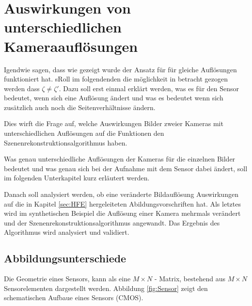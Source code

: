 \chapter{Auswirkungen von unterschiedlichen Kameraauflösungen}
\label{sec:minimalAuf} 



Igendwie sagen, dass wie gezeigt wurde der Ansatz für für gleiche Auflösungen funktioniert hat. sRoll im folgendenden die möglichkeit in betracht gezogen werden dass $\zeta \neq \zeta'$. Dazu soll erst einmal erklärt werden, was es für den Sensor bedeutet, wenn sich eine Auflösung ändert und was es bedeutet wenn sich zusätzlich auch noch die Seitenverhältnisse ändern.




Dies wirft die Frage auf, welche Auswirkungen Bilder zweier Kameras mit unterschiedlichen Auflösungen auf die Funktionen den Szenenrekonstruktionsalgorithmus haben. 


Was genau unterschiedliche Auflösungen der Kameras für die einzelnen Bilder bedeutet und was genau sich bei der Aufnahme mit dem Sensor dabei ändert, soll im folgenden Unterkapitel kurz erläutert werden. 

Danach soll analysiert werden, ob eine veränderte Bildauflösung Auswirkungen auf die in Kapitel \ref{sec:HFE} hergeleiteten Abildungsvorschriften hat. Als letztes wird im synthetischen Beispiel die Auflösung einer Kamera mehrmals verändert und der Szenenrekonstruktionsalgorithmus angewandt. Das Ergebnis des Algorithmus wird analysiert und validiert. 


\section{Abbildungsunterschiede}


Die Geometrie eines Sensors, kann als eine  $M \times N$ - Matrix, bestehend aus $M \times N$  Sensorelementen dargestellt werden\cite{Photonik}. Abbildung \ref{fig:Sensor} zeigt den schematischen Aufbaue eines Sensors (CMOS).

